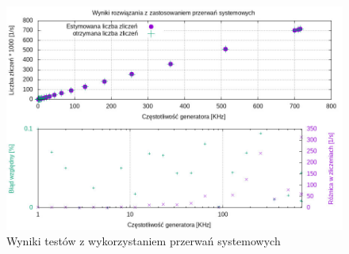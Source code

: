 \documentclass[a4paper,12pt]{article}
\begin{document}
\begin{figure}[]
        \centering
        \includegraphics[width=\textwidth]{rts.jpg}
        \caption{Wyniki testów z wykorzystaniem przerwań systemowych}
        \label{rts wyniki}
\end{figure}
\end{document}
